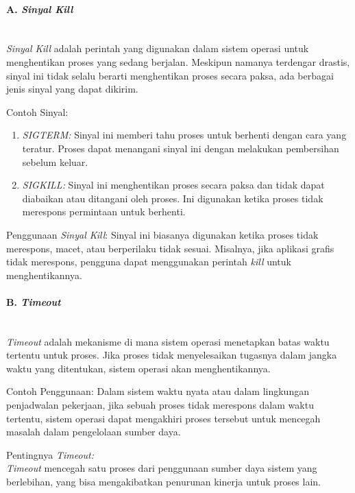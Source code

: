 \documentclass[12pt]{article}
\begin{document}
\begin{itemize}
    \paragraph{A. \textit{Sinyal Kill}} \mbox{} \\
    \textit{Sinyal Kill} adalah perintah yang digunakan dalam sistem operasi untuk menghentikan proses yang sedang berjalan. Meskipun namanya terdengar drastis, sinyal ini tidak selalu berarti menghentikan proses secara paksa, ada berbagai jenis sinyal yang dapat dikirim.

    Contoh Sinyal:
    \begin{enumerate}
        \item \textit{SIGTERM:} Sinyal ini memberi tahu proses untuk berhenti dengan cara yang teratur. Proses dapat menangani sinyal ini dengan melakukan pembersihan sebelum keluar.
        \item \textit{SIGKILL:} Sinyal ini menghentikan proses secara paksa dan tidak dapat diabaikan atau ditangani oleh proses. Ini digunakan ketika proses tidak merespons permintaan untuk berhenti.
    \end{enumerate}

    Penggunaan \textit{Sinyal Kill}:  
    \newline Sinyal ini biasanya digunakan ketika proses tidak merespons, macet, atau berperilaku tidak sesuai. Misalnya, jika aplikasi grafis tidak merespons, pengguna dapat menggunakan perintah \textit{kill} untuk menghentikannya.

    \paragraph{B. \textit{Timeout}} \mbox{} \\
    \textit{Timeout} adalah mekanisme di mana sistem operasi menetapkan batas waktu tertentu untuk proses. Jika proses tidak menyelesaikan tugasnya dalam jangka waktu yang ditentukan, sistem operasi akan menghentikannya.

    Contoh Penggunaan:  
    Dalam sistem waktu nyata atau dalam lingkungan penjadwalan pekerjaan, jika sebuah proses tidak merespons dalam waktu tertentu, sistem operasi dapat mengakhiri proses tersebut untuk mencegah masalah dalam pengelolaan sumber daya.

    Pentingnya \textit{Timeout:}  \\
    \textit{Timeout} mencegah satu proses dari penggunaan sumber daya sistem yang berlebihan, yang bisa mengakibatkan penurunan kinerja untuk proses lain.


\end{itemize}
\end{document}
